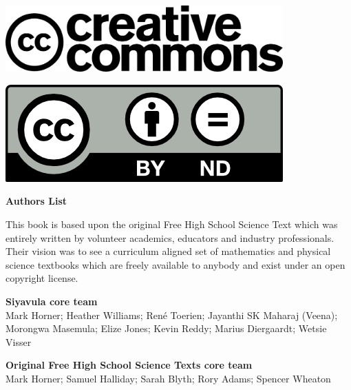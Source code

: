 \begin{center}
\begin{minipage}{0.6\textwidth}
\includegraphics[width=0.8\textwidth]{title_images/cc2.png}
\end{minipage}
\begin{minipage}{0.3\textwidth}
\includegraphics[width=0.8\textwidth]{title_images/cc1.png}
\end{minipage}
\end{center}







\newpage
\thispagestyle{empty}


\begin{flushleft} \textbf{\huge Authors List} \end{flushleft}

{\LARGE This book is based upon the original Free High School Science Text which was entirely written by
volunteer academics, educators and industry professionals. Their vision was to see a curriculum aligned
set of mathematics and physical science textbooks which are freely available to anybody and exist
under an open copyright license.} \par

\textbf{\LARGE Siyavula core team} \\

Mark Horner; Heather Williams; René Toerien; Jayanthi SK Maharaj (Veena); Morongwa Masemula; Elize Jones; Kevin Reddy; Marius Diergaardt; Wetsie Visser \par

\textbf{\LARGE Original Free High School Science Texts core team}\\

Mark Horner; Samuel Halliday; Sarah Blyth; Rory Adams; Spencer Wheaton \par 



